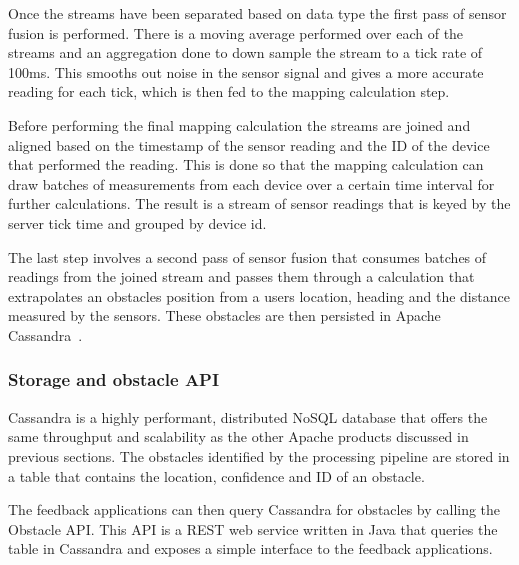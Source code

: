 \documentclass[prodmode,acmtosem]{acmsmall} %
\begin{document}
Once the streams have been separated based on data type the first pass of sensor fusion is performed. There is a moving average performed over each of the streams and an aggregation done to down sample the stream to a tick rate of 100ms. This smooths out noise in the sensor signal and gives a more accurate reading for each tick, which is then fed to the mapping calculation step.

Before performing the final mapping calculation the streams are joined and aligned based on the timestamp of the sensor reading and the ID of the device that performed the reading. This is done so that the mapping calculation can draw batches of measurements from each device over a certain time interval for further calculations. The result is a stream of sensor readings that is keyed by the server tick time and grouped by device id.

The last step involves a second pass of sensor fusion that consumes batches of readings from the joined stream and passes them through a calculation that extrapolates an obstacles position from a users location, heading and the distance measured by the sensors. These obstacles are then persisted in Apache Cassandra~\cite{ApacheCassandra}.

\subsubsection{Storage and obstacle API}
Cassandra is a highly performant, distributed NoSQL database that offers the same throughput and scalability as the other Apache products discussed in previous sections. The obstacles identified by the processing pipeline are stored in a table that contains the location, confidence and ID of an obstacle.

The feedback applications can then query Cassandra for obstacles by calling the Obstacle API. This API is a REST web service written in Java that queries the table in Cassandra and exposes a simple interface to the feedback applications.


\end{document}
